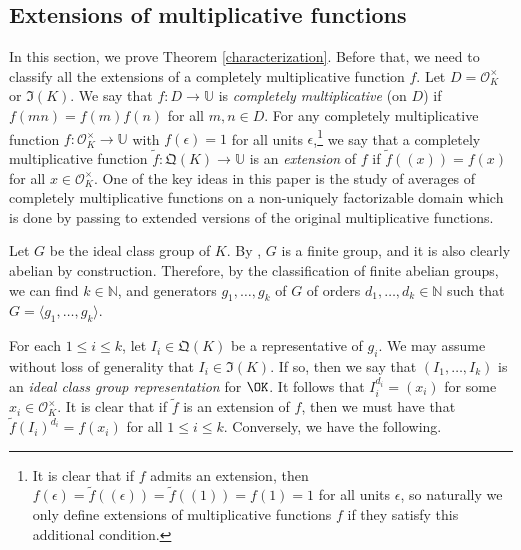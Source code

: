 \documentclass[11pt]{amsart}
\theoremstyle{definition}
\newcommand{\N}{{\mathbb N}}
\renewcommand{\S}{\mathbb{S}}
\newcommand{\U}{{\mathbb U}}
\newcommand{\e}{\epsilon}
\begin{document}
\subsection{Extensions of multiplicative functions}
In this section, we prove Theorem \ref{characterization}.
Before that, we need to classify all the extensions of a completely multiplicative function $f$. 
Let $D=\mathcal{O}_K^{\times}$ or $\mathfrak{I}(K)$.
We say that $f\colon D\to\U$ is \emph{completely multiplicative} (on $D$) if $f(mn)=f(m)f(n)$ for all $m,n\in D$. 
%
%
For any completely multiplicative function $f\colon \mathcal{O}_K^{\times} \to\U$
with $f(\e)=1$ for all units $\e$,\footnote{It is clear that if $f$ admits an extension, then   $f(\e)=\tilde{f}((\e))=\tilde{f}((1))=f(1)=1$ for all units $\e$, so naturally we only define extensions of multiplicative functions $f$ if they satisfy this additional condition.} we say that a completely multiplicative function $\tilde{f}\colon \mathfrak{Q}(K)\to\U$ is an \emph{extension} of $f$ if  $\tilde{f}((x))=f(x)$ for all $x\in \mathcal{O}_K^{\times}$. One of the key ideas in this paper is the study of averages of completely multiplicative functions on a non-uniquely factorizable domain which is done by passing to extended versions of the original multiplicative functions.

Let $G$ be the ideal class group of $K$. By \cite[Theorem~6.3]{neukirch99}, $G$ is a finite group, and it is also clearly abelian by construction. Therefore, by the classification of finite abelian groups, we can find $k\in\N$, 
    and generators $g_{1},\dots,g_{k}$ of $G$ of orders $d_{1},\dots,d_{k}\in\N$ such that $G=\langle g_1,\dots,g_k\rangle$.
   
    For each $1\leq i\leq k$, let $I_{i}\in \mathfrak{Q}(K)$ be a representative of $g_{i}$. We may assume without loss of generality that $I_{i}\in\mathfrak{I}(K)$. If so, then we say that $(I_{1},\dots,I_{k})$ is an \emph{ideal class group representation} for $\OK$. 
    It follows that $I_{i}^{d_{i}}=(x_{i})$ for some $x_{i}\in \mathcal{O}_{K}^{\times}$.
It is clear that if $\tilde{f}$ is an extension of $f$, then we must have that $\tilde{f}(I_{i})^{d_{i}}=f(x_{i})$ for all $1\leq i\leq k$. 
Conversely, we have the following.
\end{document}
